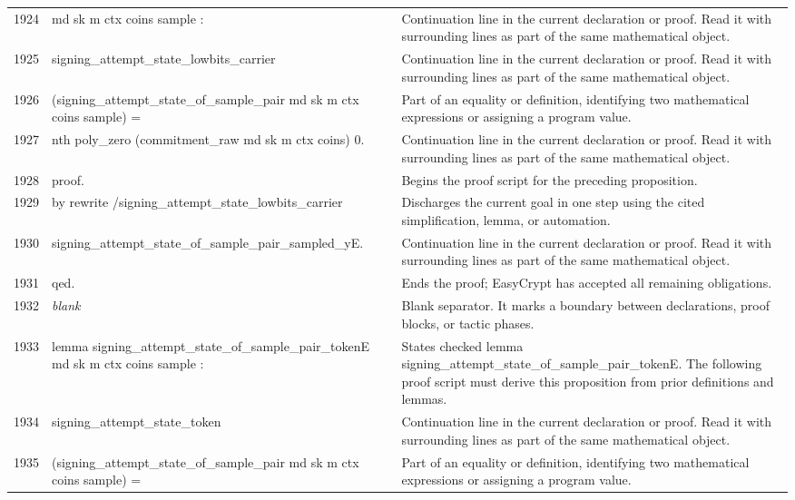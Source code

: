 \documentclass[10pt]{article}
\begin{document}
\begin{longtable}{r L{0.53\textwidth} L{0.37\textwidth}}
1924 & {\ttfamily\scriptsize    md sk m ctx coins sample :} & Continuation line in the current declaration or proof.  Read it with surrounding lines as part of the same mathematical object. \\
1925 & {\ttfamily\scriptsize   signing\_attempt\_state\_lowbits\_carrier} & Continuation line in the current declaration or proof.  Read it with surrounding lines as part of the same mathematical object. \\
1926 & {\ttfamily\scriptsize     (signing\_attempt\_state\_of\_sample\_pair md sk m ctx coins sample) =} & Part of an equality or definition, identifying two mathematical expressions or assigning a program value. \\
1927 & {\ttfamily\scriptsize   nth poly\_zero (commitment\_raw md sk m ctx coins) 0.} & Continuation line in the current declaration or proof.  Read it with surrounding lines as part of the same mathematical object. \\
1928 & {\ttfamily\scriptsize proof.} & Begins the proof script for the preceding proposition. \\
1929 & {\ttfamily\scriptsize by rewrite /signing\_attempt\_state\_lowbits\_carrier} & Discharges the current goal in one step using the cited simplification, lemma, or automation. \\
1930 & {\ttfamily\scriptsize            signing\_attempt\_state\_of\_sample\_pair\_sampled\_yE.} & Continuation line in the current declaration or proof.  Read it with surrounding lines as part of the same mathematical object. \\
1931 & {\ttfamily\scriptsize qed.} & Ends the proof; EasyCrypt has accepted all remaining obligations. \\
1932 & {\ttfamily\scriptsize \emph{blank}} & Blank separator.  It marks a boundary between declarations, proof blocks, or tactic phases. \\
1933 & {\ttfamily\scriptsize lemma signing\_attempt\_state\_of\_sample\_pair\_tokenE md sk m ctx coins sample :} & States checked lemma signing\_attempt\_state\_of\_sample\_pair\_tokenE.  The following proof script must derive this proposition from prior definitions and lemmas. \\
1934 & {\ttfamily\scriptsize   signing\_attempt\_state\_token} & Continuation line in the current declaration or proof.  Read it with surrounding lines as part of the same mathematical object. \\
1935 & {\ttfamily\scriptsize     (signing\_attempt\_state\_of\_sample\_pair md sk m ctx coins sample) =} & Part of an equality or definition, identifying two mathematical expressions or assigning a program value. \\

\end{longtable}
\end{document}
